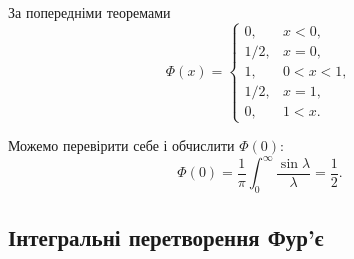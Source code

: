\begin{solution}
    За попередніми теоремами
    \begin{equation}
        \Phi(x) = \begin{cases}
            0, & x < 0, \\
            1/2, & x = 0, \\
            1, & 0 < x < 1, \\
            1/2, & x = 1, \\
            0, & 1 < x.
        \end{cases}
    \end{equation}

    Можемо перевірити себе і обчислити $\Phi(0)$:
    \begin{equation}
        \Phi(0) = \frac{1}{\pi} \int_0^\infty \frac{\sin \lambda}{\lambda} = \frac{1}{2}.
    \end{equation}
\end{solution}

\subsection{Інтегральні перетворення Фур'є}
